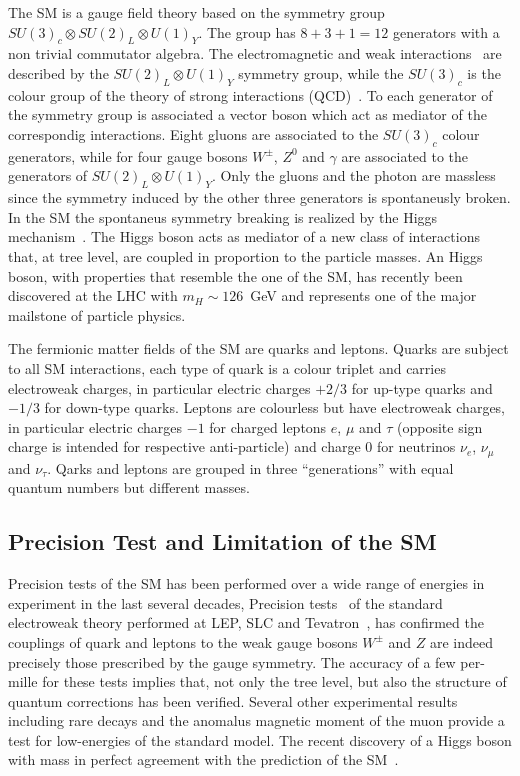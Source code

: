 The SM is a gauge field theory based on the symmetry group $SU(3)_c \otimes SU(2)_L \otimes U(1)_Y$. The group has $8+3+1=12$
generators with a non trivial commutator algebra. The electromagnetic and weak interactions~\cite{EW1,EW2,EW3}  are described  by the 
$SU(2)_L \otimes U(1)_Y$ symmetry group, while the $ SU(3)_c$ is the colour group of the theory of strong interactions (QCD)~\cite{qcd1}.
To each generator of the symmetry group is associated a vector boson which act as mediator of the correspondig interactions.
Eight gluons are associated to the $ SU(3)_c$ colour generators, while for four gauge bosons $W^{\pm}$,
$Z^0$ and $\gamma$ are associated to the generators of $SU(2)_L \otimes U(1)_Y$. 
Only the gluons and the photon are massless since the symmetry induced by the other three generators is
spontaneusly broken. In the SM the spontaneus symmetry breaking is realized by the Higgs mechanism~\cite{ENGLERT,HIGGS,HIGGS2,HIGGS3,kibble}.
The Higgs boson acts as mediator of a new class of interactions that, at tree level, are coupled in proportion to the particle masses.
An Higgs boson, with properties that resemble the one of the SM, 
has recently been discovered at the LHC with $m_H \sim 126$~GeV \cite{AHiggsO,CHiggsO} and represents one of the major mailstone of particle physics.

The fermionic matter fields of the SM are quarks and leptons. 
Quarks  are subject to all SM interactions, each type of quark is a colour triplet and carries 
electroweak charges, in particular electric charges $+2/3$ for up-type quarks and $-1/3$
for down-type quarks.  Leptons are colourless
but have electroweak charges, in particular electric charges $-1$ for charged leptons $e$, $\mu$ and $\tau$ (opposite sign charge 
is intended for respective anti-particle)  and charge 0 for neutrinos $\nu_e$, $\nu_{\mu}$ and $\nu_{\tau}$.
Qarks and leptons are grouped in three  ``generations'' with equal quantum numbers but different masses.


\subsection{Precision Test and Limitation of the SM}

Precision tests of the SM has been performed over a wide range of energies in experiment in the last several decades,
Precision tests~\cite{precisiontest} of the standard electroweak theory performed at LEP, SLC and Tevatron~\cite{smtest}, 
has confirmed the couplings of quark and leptons to the weak gauge bosons $W^{\pm}$  and $Z$ are indeed
precisely those prescribed by the gauge symmetry. The accuracy of a few per-mille for these
tests implies that, not only the tree level, but also the structure of quantum corrections has
been verified. Several other experimental results~\cite{pdg} including rare decays and the anomalus magnetic moment of the muon
provide a test for low-energies of the standard model. The recent discovery of a Higgs boson with mass in perfect agreement with 
the prediction of the SM~\cite{gfitter}.

